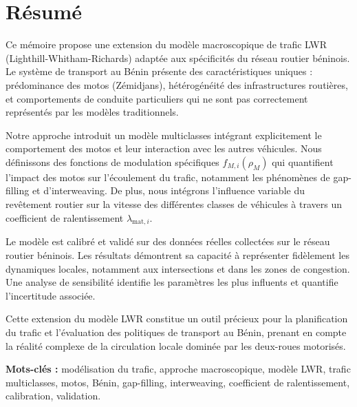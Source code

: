 \chapter*{Résumé}
\thispagestyle{empty}

Ce mémoire propose une extension du modèle macroscopique de trafic LWR (Lighthill-Whitham-Richards) adaptée aux spécificités du réseau routier béninois. Le système de transport au Bénin présente des caractéristiques uniques : prédominance des motos (Zémidjans), hétérogénéité des infrastructures routières, et comportements de conduite particuliers qui ne sont pas correctement représentés par les modèles traditionnels.

Notre approche introduit un modèle multiclasses intégrant explicitement le comportement des motos et leur interaction avec les autres véhicules. Nous définissons des fonctions de modulation spécifiques $f_{M,i}(\rho_M)$ qui quantifient l'impact des motos sur l'écoulement du trafic, notamment les phénomènes de gap-filling et d'interweaving. De plus, nous intégrons l'influence variable du revêtement routier sur la vitesse des différentes classes de véhicules à travers un coefficient de ralentissement $\lambda_{\text{mat},i}$.

Le modèle est calibré et validé sur des données réelles collectées sur le réseau routier béninois. Les résultats démontrent sa capacité à représenter fidèlement les dynamiques locales, notamment aux intersections et dans les zones de congestion. Une analyse de sensibilité identifie les paramètres les plus influents et quantifie l'incertitude associée.

Cette extension du modèle LWR constitue un outil précieux pour la planification du trafic et l'évaluation des politiques de transport au Bénin, prenant en compte la réalité complexe de la circulation locale dominée par les deux-roues motorisés.

\vspace{1cm}

\noindent \textbf{Mots-clés :} modélisation du trafic, approche macroscopique, modèle LWR, trafic multiclasses, motos, Bénin, gap-filling, interweaving, coefficient de ralentissement, calibration, validation.
